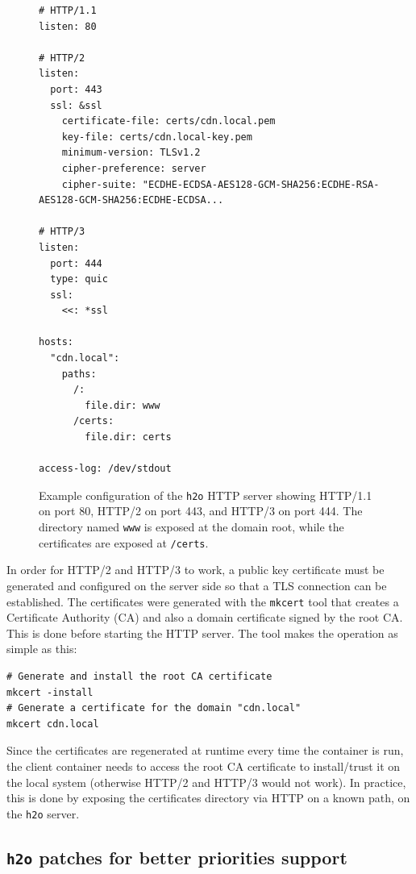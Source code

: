 \begin{figure}[h]
    \centering
    \begin{verbatim}
# HTTP/1.1
listen: 80

# HTTP/2
listen:
  port: 443
  ssl: &ssl
    certificate-file: certs/cdn.local.pem
    key-file: certs/cdn.local-key.pem
    minimum-version: TLSv1.2
    cipher-preference: server
    cipher-suite: "ECDHE-ECDSA-AES128-GCM-SHA256:ECDHE-RSA-AES128-GCM-SHA256:ECDHE-ECDSA...

# HTTP/3
listen:
  port: 444
  type: quic
  ssl:
    <<: *ssl

hosts:
  "cdn.local":
    paths:
      /:
        file.dir: www
      /certs:
        file.dir: certs

access-log: /dev/stdout
    \end{verbatim}
    \caption{Example configuration of the \texttt{h2o} HTTP server showing HTTP/1.1 on port 80, HTTP/2 on port 443, and HTTP/3 on port 444. The directory named \texttt{www} is exposed at the domain root, while the certificates are exposed at \texttt{/certs}.}
    \label{fig:h2o}
\end{figure}

In order for HTTP/2 and HTTP/3 to work, a public key certificate must be generated and configured on the server side so that a TLS connection can be established. The certificates were generated with the \texttt{mkcert} tool that creates a Certificate Authority (CA) and also a domain certificate signed by the root CA. This is done before starting the HTTP server. The tool makes the operation as simple as this:

\begin{verbatim}
# Generate and install the root CA certificate
mkcert -install
# Generate a certificate for the domain "cdn.local"
mkcert cdn.local
\end{verbatim}

Since the certificates are regenerated at runtime every time the container is run, the client container needs to access the root CA certificate to install/trust it on the local system (otherwise HTTP/2 and HTTP/3 would not work). In practice, this is done by exposing the certificates directory via HTTP on a known path, on the \texttt{h2o} server.

\subsection{\texttt{h2o} patches for better priorities support}
\label{sec:testbed/cdn/h2o}

